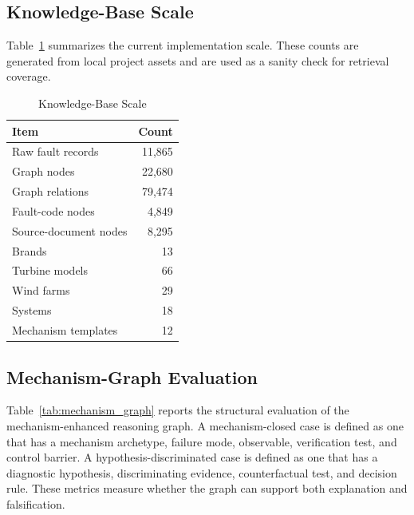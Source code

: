 \documentclass[lettersize,journal]{IEEEtran}
\begin{document}
\subsection{Knowledge-Base Scale}
Table~\ref{tab:scale} summarizes the current implementation scale. These counts are generated from local project assets and are used as a sanity check for retrieval coverage.

\begin{table}[htbp]
\caption{Knowledge-Base Scale}
\label{tab:scale}
\centering
\begin{tabular}{lr}
\toprule
Item & Count \\
\midrule
Raw fault records & 11,865 \\
Graph nodes & 22,680 \\
Graph relations & 79,474 \\
Fault-code nodes & 4,849 \\
Source-document nodes & 8,295 \\
Brands & 13 \\
Turbine models & 66 \\
Wind farms & 29 \\
Systems & 18 \\
Mechanism templates & 12 \\
\bottomrule
\end{tabular}
\end{table}

\subsection{Mechanism-Graph Evaluation}
Table~\ref{tab:mechanism_graph} reports the structural evaluation of the mechanism-enhanced reasoning graph. A mechanism-closed case is defined as one that has a mechanism archetype, failure mode, observable, verification test, and control barrier. A hypothesis-discriminated case is defined as one that has a diagnostic hypothesis, discriminating evidence, counterfactual test, and decision rule. These metrics measure whether the graph can support both explanation and falsification.
\end{document}
